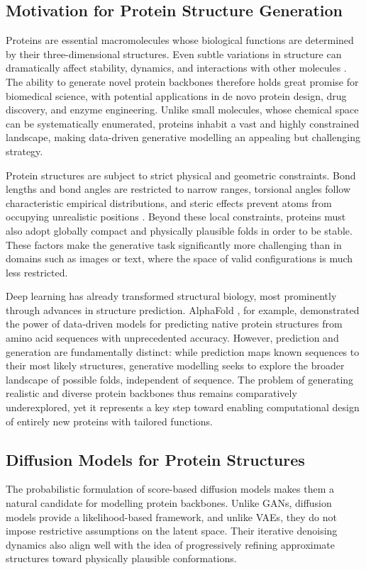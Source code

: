 \documentclass[a4paper,12pt]{article}
\begin{document}
\subsection{Motivation for Protein Structure Generation}
Proteins are essential macromolecules whose biological functions are determined by their three-dimensional structures. Even subtle variations in structure can dramatically affect stability, dynamics, and interactions with other molecules \citep{creighton1993proteins,branden2012IntroductionProteinStructure}. The ability to generate novel protein backbones therefore holds great promise for biomedical science, with potential applications in de novo protein design, drug discovery, and enzyme engineering. Unlike small molecules, whose chemical space can be systematically enumerated, proteins inhabit a vast and highly constrained landscape, making data-driven generative modelling an appealing but challenging strategy.

Protein structures are subject to strict physical and geometric constraints. Bond lengths and bond angles are restricted to narrow ranges, torsional angles follow characteristic empirical distributions, and steric effects prevent atoms from occupying unrealistic positions \citep{creighton1993proteins,branden2012IntroductionProteinStructure}. Beyond these local constraints, proteins must also adopt globally compact and physically plausible folds in order to be stable. These factors make the generative task significantly more challenging than in domains such as images or text, where the space of valid configurations is much less restricted.

Deep learning has already transformed structural biology, most prominently through advances in structure prediction. AlphaFold \citep{jumper2021HighlyAccurateProtein}, for example, demonstrated the power of data-driven models for predicting native protein structures from amino acid sequences with unprecedented accuracy. However, prediction and generation are fundamentally distinct: while prediction maps known sequences to their most likely structures, generative modelling seeks to explore the broader landscape of possible folds, independent of sequence. The problem of generating realistic and diverse protein backbones thus remains comparatively underexplored, yet it represents a key step toward enabling computational design of entirely new proteins with tailored functions.

\subsection{Diffusion Models for Protein Structures}
The probabilistic formulation of score-based diffusion models makes them a natural candidate for modelling protein backbones. Unlike GANs, diffusion models provide a likelihood-based framework, and unlike VAEs, they do not impose restrictive assumptions on the latent space. Their iterative denoising dynamics also align well with the idea of progressively refining approximate structures toward physically plausible conformations.
\end{document}
